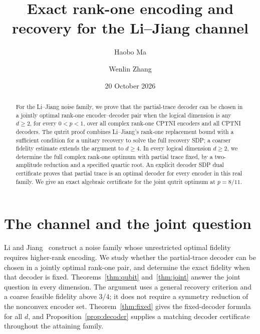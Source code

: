 \documentclass[11pt]{article}
\title{Exact rank-one encoding and recovery for the Li--Jiang channel}
\author{Haobo Ma \and Wenlin Zhang}
\date{20 October 2026}
\begin{document}
\maketitle
\begin{abstract}
For the Li--Jiang noise family, we prove that the partial-trace decoder can
be chosen in a jointly optimal rank-one encoder--decoder pair when the
logical dimension is any $d\ge2$, for every $0<p<1$, over all complex
rank-one CPTNI encoders and all CPTNI decoders. The qutrit proof combines
Li--Jiang's rank-one replacement bound with a sufficient condition for a
unitary recovery to solve the full recovery SDP; a coarser fidelity estimate
extends the argument to $d\ge4$. In every logical dimension
$d\ge2$, we determine the full complex rank-one optimum with partial trace
fixed, by a two-amplitude reduction and a specified quartic root.
An explicit decoder SDP dual certificate proves that partial trace is an
optimal decoder for every encoder in this real family. We give an exact
algebraic certificate for the joint qutrit optimum at $p=8/11$.
\end{abstract}

\section{The channel and the joint question}
Li and Jiang~\cite{LiJiang} construct a noise family whose unrestricted
optimal fidelity requires higher-rank encoding. We study whether the
partial-trace decoder can be chosen in a jointly optimal rank-one pair,
and determine the exact fidelity when that decoder is fixed.
Theorems~\ref{thm:qubit} and~\ref{thm:joint} answer the
joint question in every dimension. The argument uses a general
recovery criterion and a coarse feasible fidelity above $3/4$; it does not
require a symmetry reduction of the nonconvex encoder set.
Theorem~\ref{thm:fixed} gives the fixed-decoder
formula for all $d$, and Proposition~\ref{prop:decoder} supplies a matching
decoder certificate throughout the attaining family.
\end{document}

